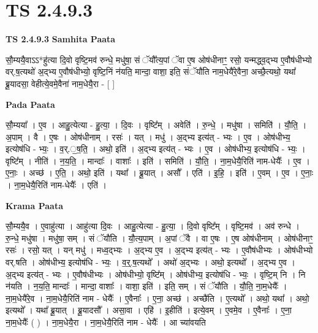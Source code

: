 \documentclass[17pt]{extarticle}
\begin{document}
\section{ TS 2.4.9.3 }

\textbf{TS 2.4.9.3 } \newline
\textbf{Samhita Paata} \newline

सौ॒म्ययै॒वाऽऽ*हु॑त्या दि॒वो वृष्टि॒मव॑ रुन्धे॒ मधु॑षा॒ सं ॅयौ᳚त्य॒पां ॅवा ए॒ष ओष॑धीनाꣳ॒॒ रसो॒ यन्मद्ध्व॒द्भ्य ए॒वौष॑धीभ्यो वर्.ष॒त्यथो॑ अ॒द्भ्य ए॒वौष॑धीभ्यो॒ वृष्टि॒निं न॑यति॒ मान्दा॒ वाशा॒ इति॒ संॅयौ॑ति नाम॒धेयै॑रे॒वैना॒ अच्छै॒त्यथो॒ यथा᳚ ब्रू॒यादसा॒ वेहीत्ये॒वमे॒वैना॑ नाम॒धेयै॒रा - [  ] \newline

\textbf{Pada Paata} \newline

सौ॒म्यया᳚ । ए॒व । आहु॒त्येत्या - हु॒त्या॒ । दि॒वः । वृष्टि᳚म् । अवेति॑ । रु॒न्धे॒ । मधु॑षा । समिति॑ । यौ॒ति॒ । अ॒पाम् । वै । ए॒षः । ओष॑धीनाम् । रसः॑ । यत् । मधु॑ । अ॒द्भ्य इत्य॑त् - भ्यः । ए॒व । ओष॑धीभ्य॒ इत्योष॑धि - भ्यः॒ । व॒र्.॒ष॒ति॒ । अथो॒ इति॑ । अ॒द्भ्य इत्य॑त् - भ्यः । ए॒व । ओष॑धीभ्य॒ इत्योष॑धि - भ्यः॒ । वृष्टि᳚म् । नीति॑ । न॒य॒ति॒ । मान्दाः᳚ । वाशाः᳚ । इति॑ । समिति॑ । यौ॒ति॒ । ना॒म॒धेयै॒रिति॑ नाम-धेयैः᳚ । ए॒व । ए॒नाः॒ । अच्छ॑ । ए॒ति॒ । अथो॒ इति॑ । यथा᳚ । ब्रू॒यात् । असौ᳚ ।   एति॑ । इ॒हि॒ । इति॑ । ए॒वम् । ए॒व । ए॒नाः॒ । ना॒म॒धेयै॒रिति॑ नाम-धेयैः᳚ । एति॑ ।  \newline


\textbf{Krama Paata} \newline

सौ॒म्ययै॒व । ए॒वाहु॑त्या । आहु॑त्या दि॒वः । आहु॒त्येत्या - हु॒त्या॒ । दि॒वो वृष्टि᳚म् । वृष्टि॒मव॑ । अव॑ रुन्धे । रु॒न्धे॒ मधु॑षा । मधु॑षा॒ सम् । सं ॅयौ॑ति । यौ॒त्य॒पाम् । अ॒पां ॅवै । वा ए॒षः । ए॒ष ओष॑धीनाम् । ओष॑धीनाꣳ॒॒ रसः॑ । रसो॒ यत् । यन् मधु॑ । मध्व॒द्भ्यः । अ॒द्भ्य ए॒व । अ॒द्भ्य इत्य॑त् - भ्यः । ए॒वौष॑धीभ्यः । ओष॑धीभ्यो वर्.षति । ओष॑धीभ्य॒ इत्योष॑धि - भ्यः॒ । व॒र्॒.ष॒त्यथो᳚ । अथो॑ अ॒द्भ्यः । अथो॒ इत्यथो᳚ । अ॒द्भ्य ए॒व । अ॒द्भ्य इत्य॑त् - भ्यः । ए॒वौष॑धीभ्यः । ओष॑धीभ्यो॒ वृष्टि᳚म् । ओष॑धीभ्य॒ इत्योष॑धि - भ्यः॒ । वृष्टि॒म् नि । नि न॑यति । न॒य॒ति॒ मान्दाः᳚ । मान्दा॒ वाशाः᳚ । वाशा॒ इति॑ । इति॒ सम् । सं ॅयौ॑ति । यौ॒ति॒ ना॒म॒धेयैः᳚ । ना॒म॒धेयै॑रे॒व । ना॒म॒धेयै॒रिति॑ नाम - धेयैः᳚ । ए॒वैनाः᳚ । ए॒ना॒ अच्छ॑ । अच्छै॑ति । ए॒त्यथो᳚ । अथो॒ यथा᳚ । अथो॒ इत्यथो᳚ । यथा᳚ ब्रू॒यात् । ब्रू॒यादसौ᳚ । असा॒वा । एहि॑ । इ॒हीति॑ । इत्ये॒वम् । ए॒वमे॒व । ए॒वैनाः᳚ । ए॒ना॒ ना॒म॒धेयैः᳚ ( ) । ना॒म॒धेयै॒रा । ना॒म॒धेयै॒रिति॑ नाम - धेयैः᳚ । आ च्या॑वयति \newline
\end{document}
